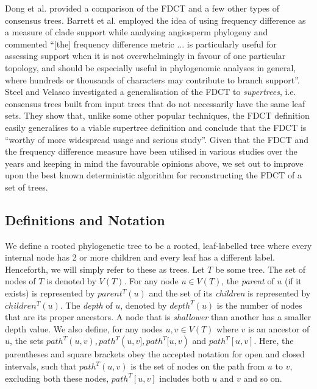 \documentclass{article}
\begin{document}
    Dong et al. \cite{dong2010majority} provided a comparison of the FDCT and a few other types of consensus trees. Barrett et al. \cite{barrett2013plastid} employed the idea of using frequency difference as a measure of clade support while analysing angiosperm phylogeny and commented ``[the] frequency difference metric ... is particularly useful for assessing support when it is not overwhelmingly in favour of one particular topology, and should be especially useful in phylogenomic analyses in general, where hundreds or thousands of characters may contribute to branch support''. Steel and Velasco \cite{steel2014axiomatic} investigated a generalisation of the FDCT to \textit{supertrees}, i.e. consensus trees built from input trees that do not necessarily have the same leaf sets. They show that, unlike some other popular techniques, the FDCT definition easily generalises to a viable supertree definition and conclude that the FDCT is ``worthy of more widespread usage and serious study''. Given that the FDCT and the frequency difference measure have been utilised in various studies over the years \cite{garcia2014testing,barrett2013plastid,molineri2010cladistic,molineri2013phylogeny,molineri2015phylogeny,lindqvist2006molecular,han2014new} and keeping in mind the favourable opinions above, we set out to improve upon the best known deterministic algorithm for reconstructing the FDCT of a set of trees.

    \subsection{Definitions and Notation}
    \label{subsec:def}

    We define a rooted phylogenetic tree to be a rooted, leaf-labelled tree where every internal node has 2 or more children and every leaf has a different label. Henceforth, we will simply refer to these as trees. Let $T$ be some tree. The set of nodes of $T$ is denoted by $V(T)$. For any node $u \in V(T)$, the \textit{parent} of $u$ (if it exists) is represented by $parent^T(u)$ and the set of its \textit{children} is represented by $children^T(u)$. The \textit{depth} of $u$, denoted by $depth^T(u)$ is the number of nodes that are its proper ancestors. A node that is \textit{shallower} than another has a smaller depth value. We also define, for any nodes $u, v \in V(T)$ where $v$ is an ancestor of $u$, the sets $path^T(u, v), path^T(u, v], path^T[u, v)$ and $path^T[u, v]$. Here, the parentheses and square brackets obey the accepted notation for open and closed intervals, such that $path^T(u, v)$ is the set of nodes on the path from $u$ to $v$, excluding both these nodes, $path^T[u, v]$ includes both $u$ and $v$ and so on.
\end{document}
